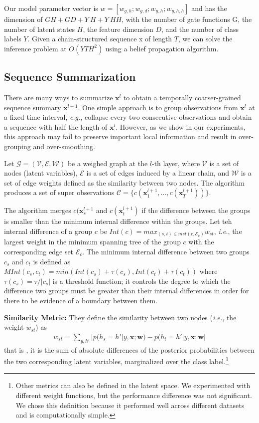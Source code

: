 \documentclass[10pt,twocolumn,letterpaper]{article}
\begin{document}
Our model parameter vector is $w = [w_{g,h};w_{g,d};w_{y,h};w_{y,h,h}]$ and has the dimension of $GH+GD+Y~H+Y~HH$, with the number of gate functions G, the number of latent states $H$, the feature dimension $D$, and the number of class labels $Y$. Given a chain-structured sequence x of length $T$, we can solve the inference problem at $O(YTH^2)$ using a belief propagation algorithm.

\subsection{Sequence Summarization}

There are many ways to summarize $\mathbf{x}^l$ to obtain a temporally coarser-grained sequence summary $\mathbf{x}^{l+1}$. One simple approach is to group observations from $\mathbf{x}^l$ at a fixed time interval, \emph{e.g.}, collapse every two consecutive observations and obtain a sequence with half the length of $\mathbf{x}^l$. However, as we show in our experiments, this approach may fail to preserve important local information and result in over-grouping and over-smoothing.

Let $\mathcal{G} = (\mathcal{V, E, W})$ be a weighed graph at the $l$-th layer, where $\mathcal{V}$ is a set of nodes (latent variables), $\mathcal{E}$ is a set of edges induced by a linear chain, and $\mathcal{W}$ is a set of edge weights defined as the similarity between two nodes. The algorithm produces a set of super observations $\mathcal{C} = \{c(\mathbf{x}_1^{l+1},\dots,c(\mathbf{x}_T^{l+1}))\}$.

The algorithm merges $c(\mathbf{x}_s^{l+1}$ and $c(\mathbf{x}_t^{l+1})$ if the difference between the groups is smaller than the minimum internal difference within the groups. Let teh internal difference of a group $c$ be $Int(c) = max_{(s,t)\in mst(c,\mathcal{E}_c)}w_{st}$, \emph{i.e.}, the largest weight in the minimum spanning tree of the group $c$ with the corresponding edge set $\mathcal{E}_c$. The minimum internal difference between two groups $c_s$ and $c_t$ is defined as $MInt(c_s,c_t) = min(Int(c_s) + \tau(c_s), Int(c_t) + \tau(c_t))$ where $\tau(c_s) = \tau /|c_s|$ is a threshold function; it controls the degree to which the difference two groups must be greater than their internal differences in order for there to be evidence of a boundary between them.

{\bf Similarity Metric:} They define the similarity between two nodes (\emph{i.e.}, the weight $w_{st}$) as~\cite{action}\\
\begin{gather}
w_{st} = \sum_{y,h'}|p(h_s = h'|y,\mathbf{x};\mathbf{w}) - p(h_t = h'|y,\mathbf{x};\mathbf{w}|
\end{gather}
that is , it is the sum of absolute differences of the posterior probabilities between the two corresponding latent variables, marginalized over the class label.\footnote{Other metrics can also be defined in the latent space. We experimented with different weight functions, but the performance difference was not significant. We chose this definition because it performed well across different datasets and is computationally simple.}
\end{document}
